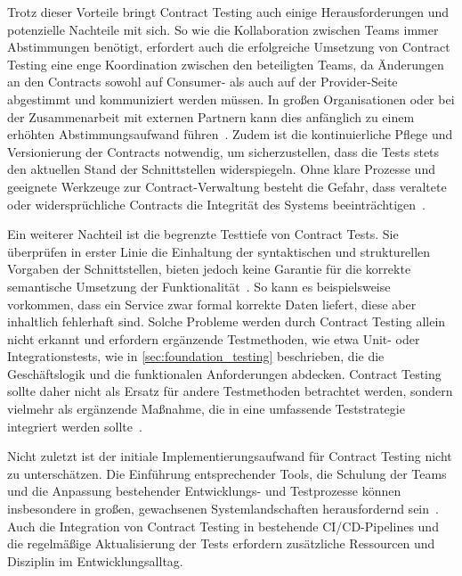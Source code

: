 Trotz dieser Vorteile bringt Contract Testing auch einige Herausforderungen und potenzielle Nachteile mit sich.
So wie die Kollaboration zwischen Teams immer Abstimmungen benötigt, erfordert auch die erfolgreiche Umsetzung von Contract Testing eine enge Koordination zwischen den beteiligten Teams, da Änderungen an den Contracts sowohl auf Consumer- als auch auf der Provider-Seite abgestimmt und kommuniziert werden müssen.
In großen Organisationen oder bei der Zusammenarbeit mit externen Partnern kann dies anfänglich zu einem erhöhten Abstimmungsaufwand führen~\cite{haroMicroserviceAPIs2023}.
Zudem ist die kontinuierliche Pflege und Versionierung der Contracts notwendig, um sicherzustellen, dass die Tests stets den aktuellen Stand der Schnittstellen widerspiegeln.
Ohne klare Prozesse und geeignete Werkzeuge zur Contract-Verwaltung besteht die Gefahr, dass veraltete oder widersprüchliche Contracts die Integrität des Systems beeinträchtigen~\cite{cruzContractTestingAction2025}.

Ein weiterer Nachteil ist die begrenzte Testtiefe von Contract Tests.
Sie überprüfen in erster Linie die Einhaltung der syntaktischen und strukturellen Vorgaben der Schnittstellen, bieten jedoch keine Garantie für die korrekte semantische Umsetzung der Funktionalität~\cite{morganTestingMicroservicesConsumerdriven2019}.
So kann es beispielsweise vorkommen, dass ein Service zwar formal korrekte Daten liefert, diese aber inhaltlich fehlerhaft sind.
Solche Probleme werden durch Contract Testing allein nicht erkannt und erfordern ergänzende Testmethoden, wie etwa Unit- oder Integrationstests, wie in \cref{sec:foundation_testing} beschrieben, die die Geschäftslogik und die funktionalen Anforderungen abdecken.
Contract Testing sollte daher nicht als Ersatz für andere Testmethoden betrachtet werden, sondern vielmehr als ergänzende Maßnahme, die in eine umfassende Teststrategie integriert werden sollte~\cite{clemsonTestingStrategiesMicroservice2014}.

Nicht zuletzt ist der initiale Implementierungsaufwand für Contract Testing nicht zu unterschätzen.
Die Einführung entsprechender Tools, die Schulung der Teams und die Anpassung bestehender Entwicklungs- und Testprozesse können insbesondere in großen, gewachsenen Systemlandschaften herausfordernd sein~\cite{cruzContractTestingAction2025}.
Auch die Integration von Contract Testing in bestehende \gls{CI}/\gls{CD}-\glspl{Pipeline} und die regelmäßige Aktualisierung der Tests erfordern zusätzliche Ressourcen und Disziplin im Entwicklungsalltag.

